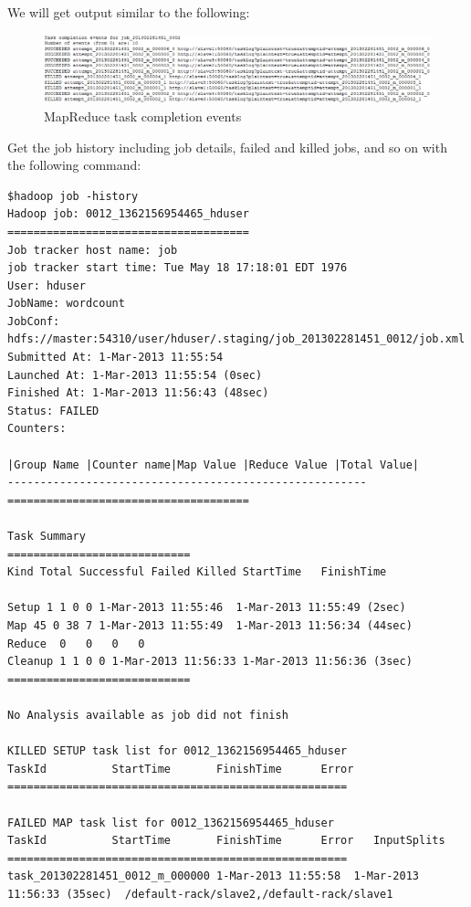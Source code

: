 We will get output similar to the following:
\begin{figure}[h]
  \centering
  \includegraphics[width=\textwidth]{figs/5163os_04_13.png}
  \caption{MapReduce task completion events}\label{fig:task.events}
\end{figure} 


Get the job history including job details, failed and killed jobs, and so on with the following command: 
\begin{verbatim}
$hadoop job -history
Hadoop job: 0012_1362156954465_hduser
=====================================
Job tracker host name: job
job tracker start time: Tue May 18 17:18:01 EDT 1976
User: hduser
JobName: wordcount
JobConf: hdfs://master:54310/user/hduser/.staging/job_201302281451_0012/job.xml
Submitted At: 1-Mar-2013 11:55:54
Launched At: 1-Mar-2013 11:55:54 (0sec)
Finished At: 1-Mar-2013 11:56:43 (48sec)
Status: FAILED
Counters:

|Group Name |Counter name|Map Value |Reduce Value |Total Value|
-------------------------------------------------------
=====================================

Task Summary
============================
Kind Total Successful Failed Killed StartTime   FinishTime

Setup 1 1 0 0 1-Mar-2013 11:55:46  1-Mar-2013 11:55:49 (2sec)
Map 45 0 38 7 1-Mar-2013 11:55:49  1-Mar-2013 11:56:34 (44sec)
Reduce  0   0   0   0
Cleanup 1 1 0 0 1-Mar-2013 11:56:33 1-Mar-2013 11:56:36 (3sec)
============================

No Analysis available as job did not finish

KILLED SETUP task list for 0012_1362156954465_hduser
TaskId          StartTime       FinishTime      Error
====================================================

FAILED MAP task list for 0012_1362156954465_hduser
TaskId          StartTime       FinishTime      Error   InputSplits
====================================================
task_201302281451_0012_m_000000 1-Mar-2013 11:55:58  1-Mar-2013 11:56:33 (35sec)  /default-rack/slave2,/default-rack/slave1


\end{verbatim}
